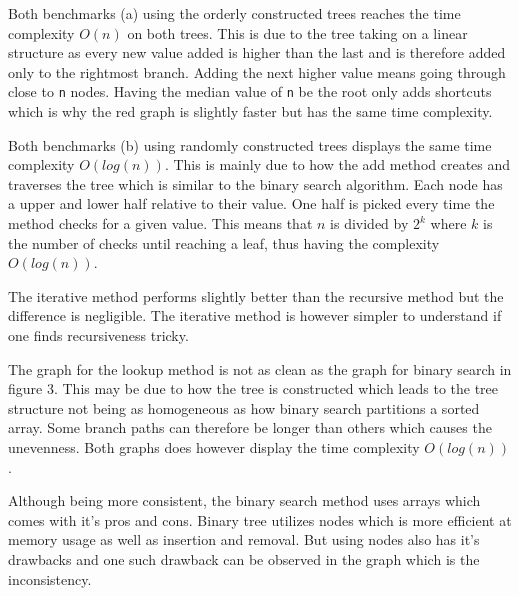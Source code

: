 \documentclass[a4paper,11pt]{article}
\begin{document}
Both benchmarks (a) using the orderly constructed trees reaches the 
time complexity $ O(n)$ on both trees. This is due to the tree taking 
on a linear structure as every new value added is higher than the last
and is therefore added only to the rightmost branch. Adding the next
higher value means going through close to {\tt n} nodes. Having the
median value of {\tt n} be the root only adds shortcuts which is why
the red graph is slightly faster but has the same time complexity.

Both benchmarks (b) using randomly constructed trees displays the same 
time complexity $ O(log(n))$. This is mainly due to how the add method
creates and traverses the tree which is similar to the binary search
algorithm. Each node has a upper and lower half relative to their value.
One half is picked every time the method checks for a given value. This 
means that $ n$ is divided by $ 2^k$ where $ k$ is the number of checks 
until reaching a leaf, thus having the complexity $ O(log(n))$.

The iterative method performs slightly better than the recursive method
but the difference is negligible. The iterative method is however
simpler to understand if one finds recursiveness tricky. 

The graph for the lookup method is not as clean as the graph for binary 
search in figure 3. This may be due to how the tree is constructed 
which leads to the tree structure not being as homogeneous as how 
binary search partitions a sorted array. Some branch paths can 
therefore be longer than others which causes the unevenness. Both 
graphs does however display the time complexity $ O(log(n))$.

Although being more consistent, the binary search method uses arrays
which comes with it's pros and cons. Binary tree utilizes nodes which
is more efficient at memory usage as well as insertion and removal.
But using nodes also has it's drawbacks and one such drawback can be
observed in the graph which is the inconsistency.
\end{document}
